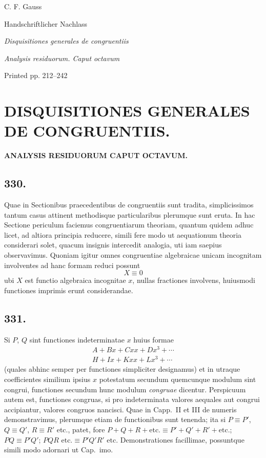 \documentclass[12pt]{article}
\begin{document}
\clearpage
{}
\begin{center}
{\Large C. F. Gauss}\par
{\large Handschriftlicher Nachlass}\par
{\large \emph{Disquisitiones generales de congruentiis}}\par
{\large \emph{Analysis residuorum. Caput octavum}}\par
{\large Printed pp. 212--242}
\end{center}
\section*{DISQUISITIONES GENERALES DE CONGRUENTIIS.}

\noindent\textbf{ANALYSIS RESIDUORUM CAPUT OCTAVUM.}

\subsection*{330.}

Quae in Sectionibus praecedentibus de congruentiis sunt tradita, simplicissimos tantum casus attinent methodisque particularibus plerumque sunt eruta. In hac Sectione periculum faciemus congruentiarum theoriam, quantum quidem adhuc licet, ad altiora principia reducere, simili fere modo ut aequationum theoria considerari solet, quacum insignis intercedit analogia, uti iam saepius observavimus. Quoniam igitur omnes congruentiae algebraicae unicam incognitam involventes ad hanc formam reduci possunt
\[
X \equiv 0
\]
ubi $X$ est functio algebraica incognitae $x$, nullas fractiones involvens, huiusmodi functiones imprimis erunt considerandae.

\subsection*{331.}

Si $P$, $Q$ sint functiones indeterminatae $x$ huius formae
\[
\begin{gathered}
A+Bx+Cxx+D x^3+\cdots\\
H+Ix+Kxx+Lx^3+\cdots
\end{gathered}
\]
(quales abhinc semper per functiones simpliciter designamus) et in utraque coefficientes similium ipsius $x$ potestatum secundum quemcunque modulum sint congrui, functiones secundum hunc modulum \textit{congruae} dicentur. Perspicuum autem est, functiones congruas, si pro indeterminata valores aequales aut congrui accipiantur, valores congruos nancisci. Quae in Capp.~II et III de numeris demonstravimus, plerumque etiam de functionibus sunt tenenda; ita si $P\equiv P'$, $Q\equiv Q'$, $R\equiv R'$ etc., patet, fore $P+Q+R+\text{etc.}\equiv P'+Q'+R'+\text{etc.}$; $PQ\equiv P'Q'$; $PQR\text{ etc.}\equiv P'Q'R'\text{ etc.}$ Demonstrationes facillimae, possuntque simili modo adornari ut Cap.~imo.
\end{document}
